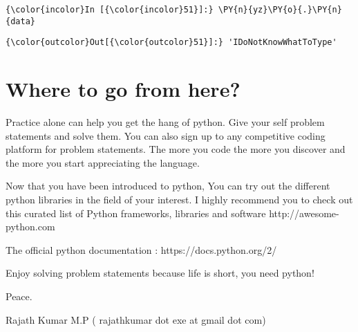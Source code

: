     \begin{Verbatim}[commandchars=\\\{\}]
{\color{incolor}In [{\color{incolor}51}]:} \PY{n}{yz}\PY{o}{.}\PY{n}{data}
\end{Verbatim}

            \begin{Verbatim}[commandchars=\\\{\}]
{\color{outcolor}Out[{\color{outcolor}51}]:} 'IDoNotKnowWhatToType'
\end{Verbatim}
        
    \section{Where to go from here?}\label{where-to-go-from-here}

    Practice alone can help you get the hang of python. Give your self
problem statements and solve them. You can also sign up to any
competitive coding platform for problem statements. The more you code
the more you discover and the more you start appreciating the language.

Now that you have been introduced to python, You can try out the
different python libraries in the field of your interest. I highly
recommend you to check out this curated list of Python frameworks,
libraries and software http://awesome-python.com

The official python documentation : https://docs.python.org/2/

Enjoy solving problem statements because life is short, you need python!

Peace.

Rajath Kumar M.P ( rajathkumar dot exe at gmail dot com)


    
    
    
    
